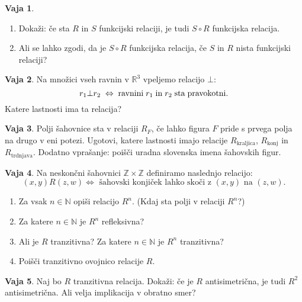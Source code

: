 \documentclass{article}
\newcommand{\ZZ}{\mathbb{Z}}
\theoremstyle{definition}
\newtheorem{vaja}{Vaja}
\begin{document}
\begin{vaja}
\begin{enumerate}
  \item Dokaži: če sta $R$ in $S$ funkcijski relaciji, je tudi $S
  \circ R$ funkcijska relacija.

  \item Ali se lahko zgodi, da je $S \circ R$ funkcijska relacija,
  če $S$ in $R$ nista funkcijski relaciji?  
\end{enumerate}
\end{vaja}

\begin{vaja}
Na množici vseh ravnin v $\mathbb{R}^3$ vpeljemo relacijo $\bot$:
$$r_1\bot r_2\;\Leftrightarrow\;{\rm ravnini\;}r_1\;{\rm in\;}r_2\;{\rm sta\;pravokotni.}$$
Katere lastnosti ima ta relacija?

\end{vaja}

\begin{vaja}
  Polji šahovnice sta v relaciji $R_F$, če lahko figura $F$ pride s prvega polja na drugo
  v eni potezi. Ugotovi, katere lastnosti imajo relacije $R_\text{kraljica}$, $R_\text{konj}$ in $R_\text{trdnjava}$. Dodatno vprašanje: poišči uradna slovenska imena šahovskih figur.
\end{vaja}

\begin{vaja}
Na neskončni šahovnici $\ZZ \times \ZZ$ definiramo naslednjo relacijo:
\begin{equation*}
(x,y)R(z,w)\Leftrightarrow\text{ šahovski konjiček lahko skoči z }(x,y)\text{ na }(z,w).
\end{equation*}
\begin{enumerate}
\item Za vsak $n\in\mathbb N$ opiši relacijo $R^n$. (Kdaj sta polji v relaciji $R^n$?)
\item Za katere $n\in\mathbb N$ je $R^n$ refleksivna?
\item Ali je $R$ tranzitivna? Za katere $n\in\mathbb N$ je $R^n$ tranzitivna?
\item Poišči tranzitivno ovojnico relacije $R$.
\end{enumerate}
\end{vaja}

\begin{vaja}
Naj bo $R$ tranzitivna relacija. Dokaži: če je $R$ antisimetrična, je tudi $R^2$ antisimetrična. Ali velja implikacija v obratno smer?
\end{vaja}
\end{document}
